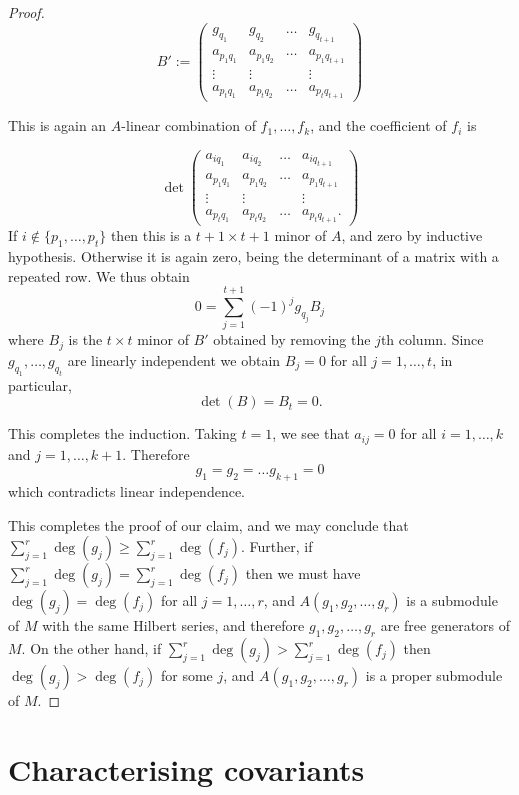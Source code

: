 \documentclass[a4paper]{amsart}
\newtheorem*{Corollary of Conjecture}{Corollary of Conjecture}
\theoremstyle{definition}
\theoremstyle{remark}
\theoremstyle{Acknowledgments}
\begin{document}
\begin{proof}
\[B':= \begin{pmatrix} g_{q_1} & g_{q_2} & \ldots & g_{q_{t+1}} \\ a_{p_1q_1} & a_{p_1q_2} & \ldots & a_{p_1 q_{t+1}} \\
\vdots & \vdots & & \vdots \\ a_{p_t q_1} & a_{p_t q_2} & \ldots & a_{p_t q_{t+1}} \end{pmatrix}\] 

This is again an $A$-linear combination of $f_1, \ldots, f_k$, and the coefficient of $f_i$ is

\[\det \begin{pmatrix} a_{i q_1} & a_{i q_2} & \ldots & a_{i q_{t+1}} \\ a_{p_1q_1} & a_{p_1q_2} & \ldots & a_{p_1 q_{t+1}} \\
\vdots & \vdots & & \vdots \\ a_{p_t q_1} & a_{p_t q_2} & \ldots & a_{p_t q_{t+1}}. \end{pmatrix}\] 
If $i \not \in \{p_1, \ldots, p_t\}$ then this is a $t+1 \times t+1$ minor of $A$, and zero by inductive hypothesis. Otherwise it is again zero, being the determinant of a matrix with a repeated row. We thus obtain
\[0 = \sum_{j=1}^{t+1} (-1)^j g_{q_j} B_{j}\] where $B_{j}$ is the $t \times t$ minor of $B'$ obtained by removing the $j$th column. Since $g_{q_1}, \ldots, g_{q_t}$ are linearly independent we obtain $B_{j} = 0$ for all $j=1, \ldots, t$, in particular, \[\det(B) = B_t = 0.\]

This completes the induction. Taking $t=1$, we see that $a_{ij} =0$ for all $i = 1, \ldots, k$ and $j = 1, \ldots, k+1$. Therefore 
\[g_1 = g_2 = \ldots g_{k+1} = 0\] which contradicts linear independence.

This completes the proof of our claim, and we may conclude that $\sum_{j=1}^r \deg(g_j) \geq \sum_{j=1}^r \deg(f_j).$
Further, if $\sum_{j=1}^r \deg(g_j) = \sum_{j=1}^r \deg(f_j)$ then we must have $\deg(g_j) = \deg(f_j)$ for all $j=1, \ldots, r$, and $A(g_1, g_2, \ldots, g_r)$ is a submodule of $M$ with the same Hilbert series, and therefore $g_1, g_2, \ldots, g_r$ are free generators of $M$. On the other hand, if $\sum_{j=1}^r \deg(g_j) > \sum_{j=1}^r \deg(f_j)$ then $\deg(g_j)> \deg(f_j)$ for some $j $, and $A(g_1, g_2, \ldots, g_r)$ is a proper submodule of $M$.
 \end{proof}


\section{Characterising covariants}
\end{document}
